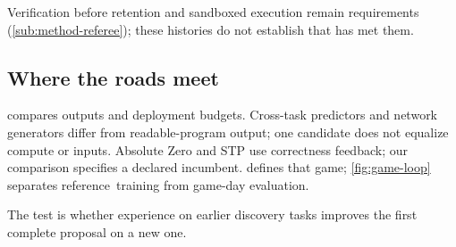 Verification before retention and sandboxed execution remain
requirements (\cref{sub:method-referee}); these histories do not establish
that \EZ{} has met them.

\subsection{Where the roads meet}\label{sub:road-meet}

 compares outputs and deployment budgets. Cross-task predictors
and network generators \citep{hollmann2025tabpfn,muller2025mothernet,kumorfm2025}
differ from readable-program output; one candidate does not equalize compute or inputs.
Absolute Zero and STP use correctness feedback; our comparison specifies
a declared incumbent.  defines that game;
\cref{fig:game-loop} separates \mbox{reference training} from game-day evaluation.

\begin{keyidea}
The test is whether experience on earlier discovery tasks improves the first
complete proposal on a new one.
\end{keyidea}
